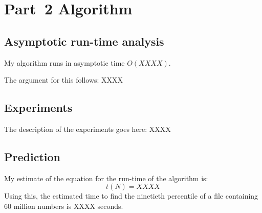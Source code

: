 \documentclass{article}
\begin{document}
\section{Part~2 Algorithm}
\label{sec:algorithm2}

\subsection{Asymptotic run-time analysis}

My algorithm runs in asymptotic time $O(XXXX)$. 

The argument for this follows:
XXXX

\subsection{Experiments}
\label{sec:experiments2}
The description of the experiments goes here: XXXX


  




\subsection{Prediction}
\label{sec:prediction2}

My estimate of the equation for the run-time of the algorithm is:
\begin{equation}
  \label{eq:estimated_runtime2}
  t(N) = XXXX
\end{equation}
Using this, the estimated time to find the ninetieth percentile of a
file containing 60 million numbers is XXXX seconds.
\end{document}
